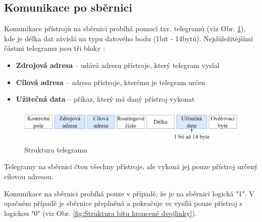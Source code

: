 \subsection{Komunikace po sběrnici}
Komunikace přístrojů na sběrnici probíhá pomocí tzv. telegramů (viz Obr. \ref{fig:Struktura telegramu}), kde je délka dat závislá na typu datového bodu  (1bit - 14bytů).
Nejdůležitějšími částmi telegramu jsou tři bloky \cite{Celkovy prehled}:
\begin{itemize}
\item\textbf{Zdrojová adresa} -- udává adresu přístroje, který telegram vyslal
\item \textbf{Cílová adresa} -- adresa přístroje, kterému je telegram určen
\item \textbf{Užitečná data} -- příkaz, který má daný přístroj vykonat\\
\end{itemize}
\begin{figure}[!h]
  \begin{center}
    \includegraphics[scale=0.7]{obrazky/Struktura telegramu.png}
  \end{center}
  \caption[Struktura telegramu \cite{Celkovy prehled}]{Struktura telegramu \cite{Celkovy prehled}}
  \label{fig:Struktura telegramu}
\end{figure}
Telegramy na sběrnici čtou všechny přístroje, ale vykoná jej pouze přístroj určený cílovou adresou.

Komunikace na sběrnici probíhá pouze v případě, že je na sběrnici logická "1". V opačném případě je sběrnice přeplněná a pokračuje ve vysílá pouze přístroj s logickou "0" (viz Obr. \ref{fig:Struktura bitu kroucené dvojlinky}). \cite{Celkovy prehled}

